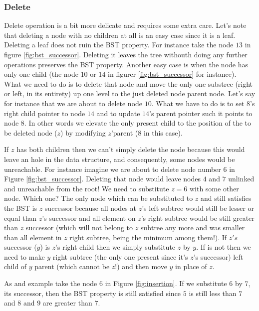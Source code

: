 \subsubsection{Delete}
Delete operation is a bit more delicate and requires some extra care. Let's note that deleting a node with no children at all is an easy case since it is a leaf. Deleting a leaf does not ruin the BST property.
For instance take the node $13$ in figure \ref{fig:bst_successor}. Deleting it leaves the tree withouth doing any further operations preserves the BST property. Another easy case is when the node has only one child (the node $10$ or $14$ in figurer \ref{fig:bst_successor} for instance).  What we need to do is to delete that node and move the only one substree (right or left, in its entirety) up one level to the just deleted node parent node. 
Let's say for instance that we are about to delete node $10$. What we have to do is to set $8$'s right child pointer to node $14$ and to update $14$'s parent pointer such it points to node $8$. In other words we elevate the only present child   to the position of the to be deleted node ($z$) by modifying $z$'parent ($8$  in this case).

If $z$ has both children then we can't simply delete the node because this would leave an hole in the data structure, and consequently, some nodes would be unreachable. For instance imagine we are about to delete node number $6$ in Figure \ref{fig:bst_successor}. Deleting that node would leave nodes $4$ and $7$ unlinked and unreachable from the root!
We need to substitute $z=6$ with some other node. Which one? The only node which can be substituted to $z$ and still satisfies the BST is $z$ successor because all nodes at $z$'s left subtree would still be lesser or equal than $z$'s successor and all element on $z$'s right subtree would be still greater than $z$ successor (which will not belong to $z$ subtree any more and was smaller than all element in $z$ right subtree, being the minimum among them!).
If $z's$ successor ($y$) is $z$'s right child then we simply substitute $z$ by $y$. 
If is not then we need to make $y$ right subtree (the only one present since it's $z$'s  successor) left child of $y$ parent (which cannot be  $z$!) and then move $y$ in place of $z$.


As and example take the node $6$ in Figure \ref{fig:insertion}. If we substitute $6$ by $7$, its successor, then the BST property is still satisfied since $5$ is still less than $7$ and $8$ and $9$ are greater than $7$.

